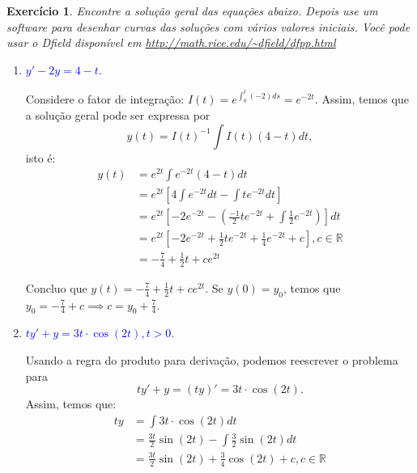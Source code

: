 \documentclass[a4paper,12pt]{article}
\theoremstyle{exer}
\newtheorem{exercise}{Exercício}
\theoremstyle{definition}
\newcommand{\enu}[1]{\textcolor{blue}{#1}}
\begin{document}
\begin{exercise}
    Encontre a solução geral das equações abaixo. Depois use um software para
    desenhar curvas das soluções com vários valores iniciais. Você pode usar o
    Dfield disponível em \url{http://math.rice.edu/~dfield/dfpp.html} 
\end{exercise}

\begin{enumerate}
    \item \enu{$y' - 2y = 4 - t$.}
    
    Considere o fator de integração: $I(t) = e^{\int_0^t (-2)ds} = e^{-2t}$.
    Assim, temos que a solução geral pode ser expressa por 
    $$y(t) = I(t)^{-1}\int I(t)(4 - t)dt,$$
    isto é:
    \begin{equation}
        \begin{split}
            y(t) &= e^{2t}\int e^{-2t}(4 - t)dt \\
            &= e^{2t}[4\int e^{-2t}dt - \int te^{-2t}dt] \\
            &= e^{2t}\left[-2e^{-2t} - \left(\frac{-1}{2}te^{-2t} + \int \frac{1}{2}e^{-2t}\right)\right]dt \\
            &= e^{2t}\left[-2e^{-2t} + \frac{1}{2}te^{-2t} + \frac{1}{4}e^{-2t} + c\right], c \in \mathbb{R} \\
            &= -\frac{7}{4} + \frac{1}{2}t + ce^{2t}
        \end{split}
    \end{equation}

    Concluo que $y(t) = -\frac{7}{4} + \frac{1}{2}t + ce^{2t}$. Se $y(0) = y_0$, temos que $y_0 = -\frac{7}{4} + c \implies c = y_0 + \frac{7}{4}$.

    \item \enu{$ty' + y = 3t \cdot \cos(2t), t > 0$.} 
    
    Usando a regra do produto para derivação, podemos reescrever o problema
    para  
    $$ty' + y = (ty)' = 3t\cdot \cos(2t).$$ 
    Assim, temos que:
    \begin{equation}
        \begin{split}
            ty &= \int 3t\cdot \cos(2t) dt \\
            &= \frac{3t}{2}\sin(2t) - \int \frac{3}{2}\sin(2t)dt \\
            &= \frac{3t}{2}\sin(2t) + \frac{3}{4}\cos(2t) + c, c \in \mathbb{R}
        \end{split}
    \end{equation}


\end{enumerate}
\end{document}
